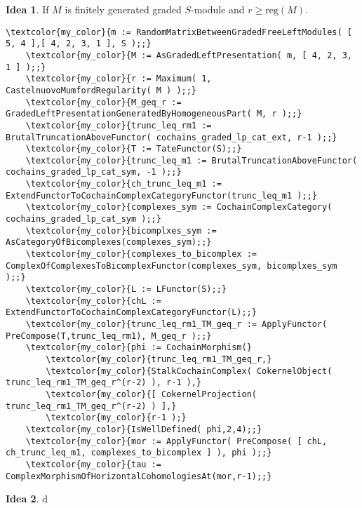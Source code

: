 \documentclass[16pt,a4paper]{extarticle}
\theoremstyle{definition}
\newtheorem{idea}{Idea}
\theoremstyle{theorem}
\begin{document}
    
    \begin{idea}
        If $M$ is finitely generated graded $S$-module and $r\geq\mathrm{reg}(M)$.
    \end{idea}
    \begin{Verbatim}[commandchars=\\\{\}, fontseries=b, frame=single, label=Gap Code, framerule=0.5mm, rulecolor=\color{rule_color} ]
    \textcolor{my_color}{m := RandomMatrixBetweenGradedFreeLeftModules( [ 5, 4 ],[ 4, 2, 3, 1 ], S );;}
    \textcolor{my_color}{M := AsGradedLeftPresentation( m, [ 4, 2, 3, 1 ] );;}
    \textcolor{my_color}{r := Maximum( 1, CastelnuovoMumfordRegularity( M ) );;}
    \textcolor{my_color}{M_geq_r := GradedLeftPresentationGeneratedByHomogeneousPart( M, r );;}
    \textcolor{my_color}{trunc_leq_rm1 := BrutalTruncationAboveFunctor( cochains_graded_lp_cat_ext, r-1 );;}
    \textcolor{my_color}{T := TateFunctor(S);;}
    \textcolor{my_color}{trunc_leq_m1 := BrutalTruncationAboveFunctor( cochains_graded_lp_cat_sym, -1 );;}
    \textcolor{my_color}{ch_trunc_leq_m1 := ExtendFunctorToCochainComplexCategoryFunctor(trunc_leq_m1 );;}
    \textcolor{my_color}{complexes_sym := CochainComplexCategory( cochains_graded_lp_cat_sym );;}
    \textcolor{my_color}{bicomplxes_sym := AsCategoryOfBicomplexes(complexes_sym);;}
    \textcolor{my_color}{complexes_to_bicomplex := ComplexOfComplexesToBicomplexFunctor(complexes_sym, bicomplxes_sym );;}
    \textcolor{my_color}{L := LFunctor(S);;}
    \textcolor{my_color}{chL := ExtendFunctorToCochainComplexCategoryFunctor(L);;}
    \textcolor{my_color}{trunc_leq_rm1_TM_geq_r := ApplyFunctor( PreCompose(T,trunc_leq_rm1), M_geq_r );;}
    \textcolor{my_color}{phi := CochainMorphism(}
        \textcolor{my_color}{trunc_leq_rm1_TM_geq_r,}
        \textcolor{my_color}{StalkCochainComplex( CokernelObject( trunc_leq_rm1_TM_geq_r^(r-2) ), r-1 ),}
        \textcolor{my_color}{[ CokernelProjection( trunc_leq_rm1_TM_geq_r^(r-2) ) ],}
        \textcolor{my_color}{r-1 );}
    \textcolor{my_color}{IsWellDefined( phi,2,4);;}
    \textcolor{my_color}{mor := ApplyFunctor( PreCompose( [ chL, ch_trunc_leq_m1, complexes_to_bicomplex ] ), phi );;}
    \textcolor{my_color}{tau := ComplexMorphismOfHorizontalCohomologiesAt(mor,r-1);;}
    \end{Verbatim}

\begin{idea}
    d
\end{idea}
\end{document}
